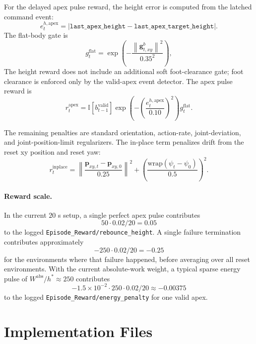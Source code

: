 \documentclass[11pt, a4paper]{article}
\begin{document}
For the delayed apex pulse reward, the height error is computed from the
latched command event:
\begin{equation}
    e^{h,\mathrm{apex}}_t =
    |\texttt{last\_apex\_height}-\texttt{last\_apex\_target\_height}|.
\end{equation}
The flat-body gate is
\begin{equation}
    g^{\mathrm{flat}}_t =
    \exp\left(
        -\frac{\left\lVert \bm{g}^{b}_{t,xy}\right\rVert^2}{0.35^2}
    \right),
\end{equation}
The height reward does not include an additional soft foot-clearance gate;
foot clearance is enforced only by the valid-apex event detector.
The apex pulse reward is
\begin{equation}
    r^{\mathrm{apex}}_t =
    \mathbb{I}[b^{\mathrm{valid}}_{t-1}]
    \exp\left(-\left(\frac{e^{h,\mathrm{apex}}_t}{0.10}\right)^2\right)
    g^{\mathrm{flat}}_t.
\end{equation}

The remaining penalties are standard orientation, action-rate, joint-deviation,
and joint-position-limit regularizers. The in-place term penalizes drift from
the reset xy position and reset yaw:
\begin{equation}
    r^{\mathrm{inplace}}_t =
    \left\lVert
        \frac{\bm{p}_{xy,t}-\bm{p}_{xy,0}}{0.25}
    \right\rVert^2
    +
    \left(
        \frac{\mathrm{wrap}(\psi_t-\psi_0)}{0.5}
    \right)^2.
\end{equation}

\paragraph{Reward scale.}
In the current $20$ s setup, a single perfect apex pulse contributes
\[
    50 \cdot 0.02 / 20 = 0.05
\]
to the logged \texttt{Episode\_Reward/rebounce\_height}. A single failure
termination contributes approximately
\[
    -250 \cdot 0.02 / 20 = -0.25
\]
for the environments where that failure happened, before averaging over all
reset environments. With the current absolute-work weight, a typical sparse
energy pulse of $W^{\mathrm{abs}}/h^{*}\approx 250$ contributes
\[
    -1.5\times10^{-2}\cdot250\cdot0.02/20 \approx -0.00375
\]
to the logged \texttt{Episode\_Reward/energy\_penalty} for one valid apex.

\section{Implementation Files}
\end{document}
